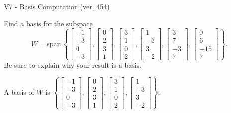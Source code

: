\begin{exercise}
  \begin{exerciseTitle}V7 - Basis Computation (ver. 454)\end{exerciseTitle}
  \begin{exerciseStatement}
    Find a basis for the subspace 
\[W=\mathrm{span}\ \left\{\left[\begin{array}{r}
-1 \\
-3 \\
0 \\
-3
\end{array}\right] , \left[\begin{array}{r}
0 \\
2 \\
3 \\
1
\end{array}\right] , \left[\begin{array}{r}
3 \\
1 \\
0 \\
2
\end{array}\right] , \left[\begin{array}{r}
1 \\
-3 \\
3 \\
-2
\end{array}\right] , \left[\begin{array}{r}
3 \\
7 \\
-3 \\
7
\end{array}\right] , \left[\begin{array}{r}
0 \\
6 \\
-15 \\
7
\end{array}\right]\right\}.\]
 Be sure to explain why your result is a basis.


  \end{exerciseStatement}
  \begin{exerciseAnswer}
   A basis of \(W\) is  \(\left\{\left[\begin{array}{r}
-1 \\
-3 \\
0 \\
-3
\end{array}\right] , \left[\begin{array}{r}
0 \\
2 \\
3 \\
1
\end{array}\right] , \left[\begin{array}{r}
3 \\
1 \\
0 \\
2
\end{array}\right] , \left[\begin{array}{r}
1 \\
-3 \\
3 \\
-2
\end{array}\right]\right\}\).
  


  \end{exerciseAnswer}
\end{exercise}